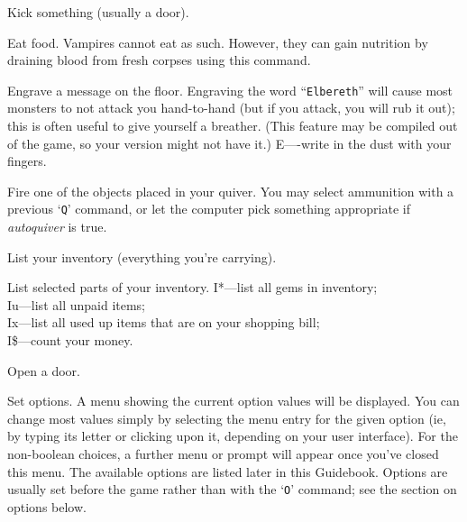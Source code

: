 \item[\tb{\^{}{\rm D}}]
Kick something (usually a door).

\item[\tb{{\rm e}}]
Eat food. Vampires cannot eat as such. However, they can gain nutrition by
draining blood from fresh corpses using this command.

\item[\tb{{\rm E}}]
Engrave a message on the floor.
Engraving the word ``{\tt Elbereth}'' will cause most monsters to not attack
you hand-to-hand (but if you attack, you will rub it out); this is
often useful to give yourself a breather.  (This feature may be compiled out
of the game, so your version might not have it.)
E----write in the dust with your fingers.  

\item[\tb{{\rm f}}]
Fire one of the objects placed in your quiver.  You may select
ammunition with a previous `{\tt Q}' command, or let the computer pick
something appropriate if
{\it autoquiver\/} 
is true.

\item[\tb{{\rm i}}]
List your inventory (everything you're carrying).

\item[\tb{{\rm I}}]
List selected parts of your inventory.
I*---list all gems in inventory;\\
Iu---list all unpaid items;\\
Ix---list all used up items that are on your shopping bill;\\
I\$---count your money.

\item[\tb{{\rm o}}]
Open a door.

\item[\tb{{\rm O}}]
Set options.  A menu showing the current option values will be
displayed.  You can change most values simply by selecting the menu
entry for the given option (ie, by typing its letter or clicking upon
it, depending on your user interface).  For the non-boolean choices,
a further menu or prompt will appear once you've closed this menu.
The available options
are listed later in this Guidebook.  Options are usually set before the
game rather than with the `{\tt O}' command; see the section on options below.

